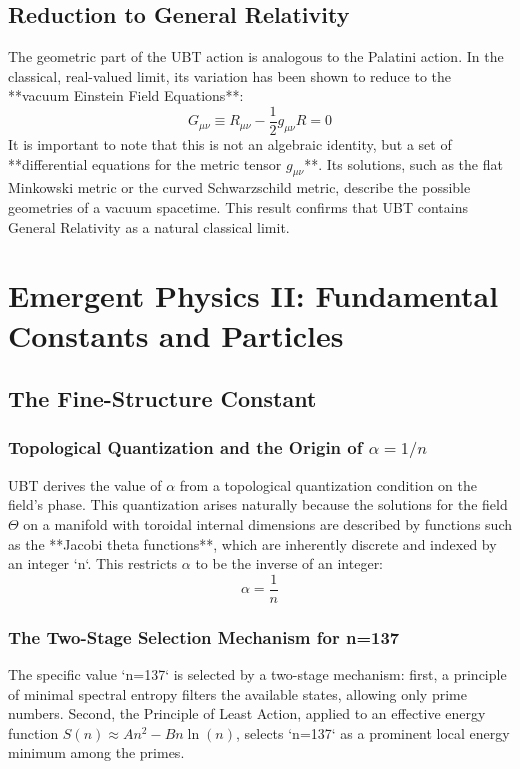 \documentclass[12pt, a4paper]{article}
\begin{document}
\subsection{Reduction to General Relativity}
The geometric part of the UBT action is analogous to the Palatini action. In the classical, real-valued limit, its variation has been shown to reduce to the **vacuum Einstein Field Equations**:
\begin{equation}
    G_{\mu\nu} \equiv R_{\mu\nu} - \frac{1}{2} g_{\mu\nu} R = 0
\end{equation}
It is important to note that this is not an algebraic identity, but a set of **differential equations for the metric tensor \( g_{\mu\nu} \)**. Its solutions, such as the flat Minkowski metric or the curved Schwarzschild metric, describe the possible geometries of a vacuum spacetime. This result confirms that UBT contains General Relativity as a natural classical limit.

\section{Emergent Physics II: Fundamental Constants and Particles}
\subsection{The Fine-Structure Constant}
\subsubsection{Topological Quantization and the Origin of \( \alpha = 1/n \)}
UBT derives the value of \( \alpha \) from a topological quantization condition on the field's phase. This quantization arises naturally because the solutions for the field \( \Theta \) on a manifold with toroidal internal dimensions are described by functions such as the **Jacobi theta functions**, which are inherently discrete and indexed by an integer `n`. This restricts \( \alpha \) to be the inverse of an integer:
\begin{equation}
    \alpha = \frac{1}{n}
\end{equation}

\subsubsection{The Two-Stage Selection Mechanism for n=137}
The specific value `n=137` is selected by a two-stage mechanism: first, a principle of minimal spectral entropy filters the available states, allowing only prime numbers. Second, the Principle of Least Action, applied to an effective energy function \( S(n) \approx A n^2 - B n \ln(n) \), selects `n=137` as a prominent local energy minimum among the primes.
\end{document}
